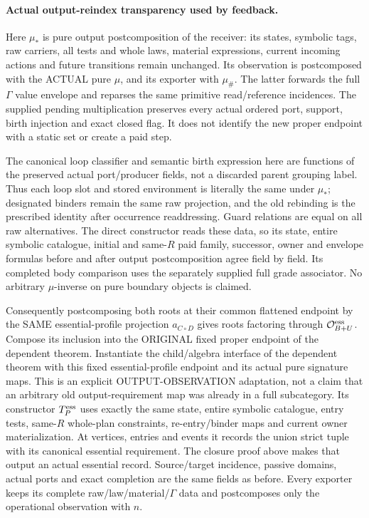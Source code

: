 \documentclass[11pt]{article}
\begin{document}
\paragraph{Actual output-reindex transparency used by feedback.}
Here $\mu_*$ is pure output postcomposition of the receiver: its states, symbolic tags, raw carriers, all tests and whole laws, material expressions, current incoming actions and future transitions remain unchanged. Its observation is postcomposed with the ACTUAL pure $\mu$, and its exporter with $\mu_\#$. The latter forwards the full $\Gamma$ value envelope and reparses the same primitive read/reference incidences. The supplied pending multiplication preserves every actual ordered port, support, birth injection and exact closed flag. It does not identify the new proper endpoint with a static set or create a paid step.

The canonical loop classifier and semantic birth expression here are functions of the preserved actual port/producer fields, not a discarded parent grouping label. Thus each loop slot and stored environment is literally the same under $\mu_*$; designated binders remain the same raw projection, and the old rebinding is the prescribed identity after occurrence readdressing. Guard relations are equal on all raw alternatives. The direct constructor reads these data, so its state, entire symbolic catalogue, initial and same-$R$ paid family, successor, owner and envelope formulas before and after output postcomposition agree field by field. Its completed body comparison uses the separately supplied full grade associator. No arbitrary $\mu$-inverse on pure boundary objects is claimed.

Consequently postcomposing both roots at their common flattened endpoint by the SAME essential-profile projection $a_{C\circ D}$ gives roots factoring through $\mathcal O_{B+U}^{\rm ess}$. Compose its inclusion into the ORIGINAL fixed proper endpoint of the dependent theorem. Instantiate the child/algebra interface of the dependent theorem with this fixed essential-profile endpoint and its actual pure signature maps. This is an explicit OUTPUT-OBSERVATION adaptation, not a claim that an arbitrary old output-requirement map was already in a full subcategory. Its constructor $T_P^{\rm ess}$ uses exactly the same state, entire symbolic catalogue, entry tests, same-$R$ whole-plan constraints, re-entry/binder maps and current owner materialization. At vertices, entries and events it records the union strict tuple with its canonical essential requirement. The closure proof above makes that output an actual essential record. Source/target incidence, passive domains, actual ports and exact completion are the same fields as before. Every exporter keeps its complete raw/law/material/$\Gamma$ data and postcomposes only the operational observation with $n$.
\end{document}
